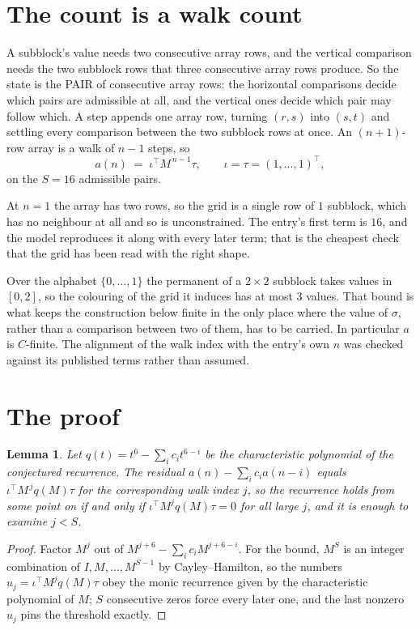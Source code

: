 \documentclass[11pt,a4paper]{article}
\theoremstyle{plain}
\newtheorem{lemma}[theorem]{Lemma}
\theoremstyle{definition}
\begin{document}
\section{The count is a walk count}

A subblock's value needs two consecutive array rows, and the vertical
comparison needs the two subblock rows that three consecutive array rows produce. So the state
is the PAIR of consecutive array rows: the horizontal comparisons decide which pairs are
admissible at all, and the vertical ones decide which pair may follow which. A step appends one
array row, turning $(r,s)$ into $(s,t)$ and settling every comparison between the two subblock
rows at once. An $(n+1)$-row array is a walk of $n-1$ steps, so
\[
a(n)\;=\;\iota^{\!\top}M^{\,n-1}\tau,\qquad\iota=\tau=(1,\dots,1)^{\!\top},
\]
on the $S=16$ admissible pairs.

At $n=1$ the array has two rows, so the grid is a single row of $1$
subblock, which has no neighbour at all and so is unconstrained. The
entry's first term is $16$, and the model reproduces it along with every later term; that
is the cheapest check that the grid has been read with the right shape.

Over the alphabet $\{0,\dots,1\}$ the permanent of a $2\times2$ subblock takes values in
$[0,2]$, so the colouring of the grid it induces has at most $3$ values.
That bound is what keeps the construction below finite in the only place where the value of
$\sigma$, rather than a comparison between two of them, has to be carried.
In particular $a$ is $C$-finite. The alignment of the walk index with the entry's own $n$ was
checked against its published terms rather than assumed.

\section{The proof}

\begin{lemma}\label{lem:crit}
Let $q(t)=t^{6}-\sum_i c_it^{6-i}$ be the characteristic polynomial of the
conjectured recurrence. The residual $a(n)-\sum_ic_ia(n-i)$ equals
$\iota^{\!\top}M^{\,j}q(M)\tau$ for the corresponding walk index $j$, so the recurrence
holds from some point on if and only if $\iota^{\!\top}M^{j}q(M)\tau=0$ for all large $j$,
and it is enough to examine $j<S$.
\end{lemma}

\begin{proof}
Factor $M^{j}$ out of $M^{j+6}-\sum_ic_iM^{j+6-i}$. For the bound, $M^{S}$
is an integer combination of $I,M,\dots,M^{S-1}$ by Cayley--Hamilton, so the numbers
$u_j=\iota^{\!\top}M^{j}q(M)\tau$ obey the monic recurrence given by the characteristic
polynomial of $M$; $S$ consecutive zeros force every later one, and the last nonzero $u_j$
pins the threshold exactly.
\end{proof}
\end{document}

